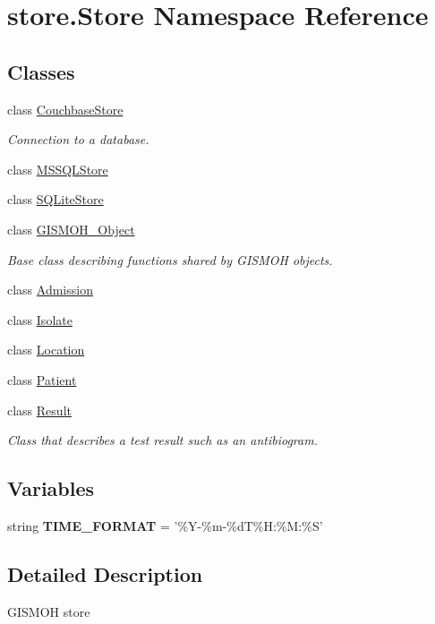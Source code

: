 \hypertarget{namespacestore_1_1_store}{\section{store.\-Store Namespace Reference}
\label{namespacestore_1_1_store}
}
\subsection*{Classes}
\begin{DoxyCompactItemize}
\item 
class \hyperlink{classstore_1_1_store_1_1_couchbase_store}{Couchbase\-Store}
\begin{DoxyCompactList}\small\item\em Connection to a database. \end{DoxyCompactList}\item 
class \hyperlink{classstore_1_1_store_1_1_m_s_s_q_l_store}{M\-S\-S\-Q\-L\-Store}
\item 
class \hyperlink{classstore_1_1_store_1_1_s_q_lite_store}{S\-Q\-Lite\-Store}
\item 
class \hyperlink{classstore_1_1_store_1_1_g_i_s_m_o_h___object}{G\-I\-S\-M\-O\-H\-\_\-\-Object}
\begin{DoxyCompactList}\small\item\em Base class describing functions shared by G\-I\-S\-M\-O\-H objects. \end{DoxyCompactList}\item 
class \hyperlink{classstore_1_1_store_1_1_admission}{Admission}
\item 
class \hyperlink{classstore_1_1_store_1_1_isolate}{Isolate}
\item 
class \hyperlink{classstore_1_1_store_1_1_location}{Location}
\item 
class \hyperlink{classstore_1_1_store_1_1_patient}{Patient}
\item 
class \hyperlink{classstore_1_1_store_1_1_result}{Result}
\begin{DoxyCompactList}\small\item\em Class that describes a test result such as an antibiogram. \end{DoxyCompactList}\end{DoxyCompactItemize}
\subsection*{Variables}
\begin{DoxyCompactItemize}
\item 
\hypertarget{namespacestore_1_1_store_a53fdf27dcda71b32ea63bd7da67fd879}{string {\bfseries T\-I\-M\-E\-\_\-\-F\-O\-R\-M\-A\-T} = '\%Y-\/\%m-\/\%d\-T\%H\-:\%M\-:\%S'}\label{namespacestore_1_1_store_a53fdf27dcda71b32ea63bd7da67fd879}

\end{DoxyCompactItemize}


\subsection{Detailed Description}
\begin{DoxyVerb}GISMOH store
\end{DoxyVerb}
 